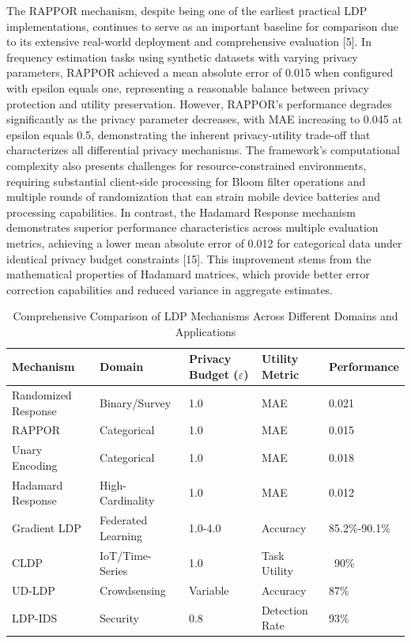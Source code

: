\documentclass[conference]{IEEEtran}
\begin{document}
The RAPPOR mechanism, despite being one of the earliest practical LDP implementations, continues to serve as an important baseline for comparison due to its extensive real-world deployment and comprehensive evaluation [5]. In frequency estimation tasks using synthetic datasets with varying privacy parameters, RAPPOR achieved a mean absolute error of 0.015 when configured with epsilon equals one, representing a reasonable balance between privacy protection and utility preservation. However, RAPPOR's performance degrades significantly as the privacy parameter decreases, with MAE increasing to 0.045 at epsilon equals 0.5, demonstrating the inherent privacy-utility trade-off that characterizes all differential privacy mechanisms. The framework's computational complexity also presents challenges for resource-constrained environments, requiring substantial client-side processing for Bloom filter operations and multiple rounds of randomization that can strain mobile device batteries and processing capabilities. In contrast, the Hadamard Response mechanism demonstrates superior performance characteristics across multiple evaluation metrics, achieving a lower mean absolute error of 0.012 for categorical data under identical privacy budget constraints [15]. This improvement stems from the mathematical properties of Hadamard matrices, which provide better error correction capabilities and reduced variance in aggregate estimates.

\begin{table}[h]
\centering
\renewcommand{\arraystretch}{2.0}
\caption{Comprehensive Comparison of LDP Mechanisms Across Different Domains and Applications}
\begin{tabular}{|p{1.3cm}|p{1.5cm}|p{1.3cm}|p{1.3cm}|p{1.3cm}|}
\hline
\textbf{Mechanism} & \textbf{Domain} & \textbf{Privacy Budget ($\varepsilon$)} & \textbf{Utility Metric} & \textbf{Performance} \\
\hline
Randomized Response & Binary/Survey & 1.0 & MAE & 0.021 \\
\hline
RAPPOR & Categorical & 1.0 & MAE & 0.015 \\
\hline
Unary Encoding & Categorical & 1.0 & MAE & 0.018 \\
\hline
Hadamard Response & High-Cardinality & 1.0 & MAE & 0.012 \\
\hline
Gradient LDP & Federated Learning & 1.0-4.0 & Accuracy & 85.2\%-90.1\% \\
\hline
CLDP & IoT/Time-Series & 1.0 & Task Utility & ~90\% \\
\hline
UD-LDP & Crowdsensing & Variable & Accuracy & 87\% \\
\hline
LDP-IDS & Security & 0.8 & Detection Rate & 93\% \\
\hline
\end{tabular}
\end{table}
\end{document}
